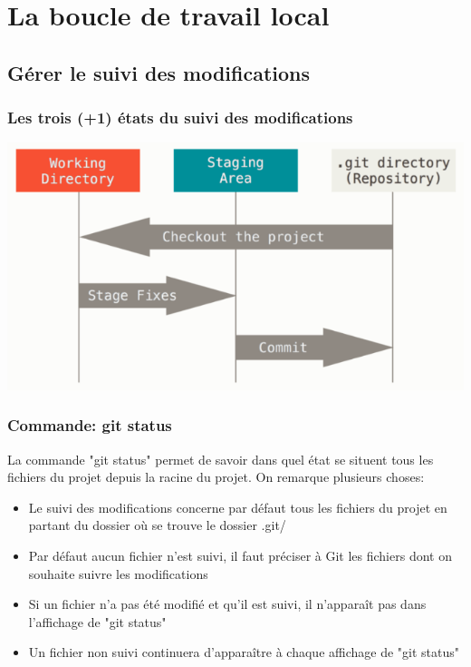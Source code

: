 \documentclass{beamer}
\begin{document}
\section{La boucle de travail local}

\subsection{Gérer le suivi des modifications}
\begin{frame}
\frametitle{Les trois (+1) états du suivi des modifications}

\begin{center}
    \includegraphics[scale=0.4]{images/boucle_locale/threeStates.png}
\end{center}

\end{frame}

\begin{frame}
\frametitle{Commande: git status}
La commande "git status" permet de savoir dans quel état se situent tous les fichiers du projet depuis la racine du projet. On remarque plusieurs choses:

\begin{itemize}
    \item Le suivi des modifications concerne par défaut tous les fichiers du projet en partant du dossier où se trouve le dossier .git/
    \item Par défaut aucun fichier n'est suivi, il faut préciser à Git les fichiers dont on souhaite suivre les modifications
    \item Si un fichier n'a pas été modifié et qu'il est suivi, il n'apparaît pas dans l'affichage de "git status"
    \item Un fichier non suivi continuera d'apparaître à chaque affichage de "git status"
\end{itemize}

\end{frame}
\end{document}
